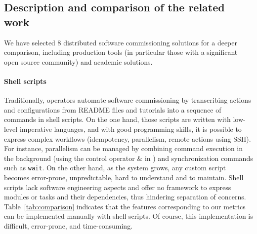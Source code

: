 \subsection{Description and comparison of the related work}

We have selected 8 distributed software commissioning solutions for a
deeper comparison, including production tools (in particular those
with a significant open source community) and academic solutions.
%

\paragraph{Shell scripts}
Traditionally, operators automate software commissioning by
transcribing actions and configurations from README files and
tutorials into a sequence of commands in shell scripts. On the one
hand, those scripts are written with low-level imperative languages,
and with good programming skills, it is possible to express complex
workflows (\eg idempotency, parallelism, remote actions using
SSH). For instance, parallelism can be managed by combining command
execution in the background (\eg using the control operator \& in
\bash) and synchronization commands such as \texttt{wait}. On the
other hand, as the system grows, any custom script becomes
error-prone, unpredictable, hard to understand and to maintain. Shell
scripts lack software engineering aspects and offer no framework to
express modules or tasks and their dependencies, thus hindering
separation of concerns. Table~\ref{tab:comparison} indicates that the
features corresponding to our metrics can be implemented manually with
shell scripts. Of course, this implementation is difficult, error-prone, and
time-consuming.

